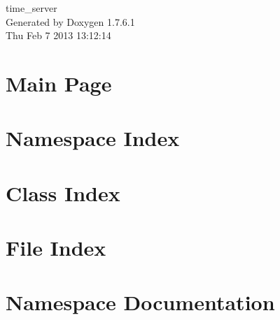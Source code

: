 \documentclass[a4paper]{book}
\begin{document}
\begin{titlepage}
\vspace*{7cm}
\begin{center}
{\Large time\-\_\-server }\\
\vspace*{1cm}
{\large \-Generated by Doxygen 1.7.6.1}\\
\vspace*{0.5cm}
{\small Thu Feb 7 2013 13:12:14}\\
\end{center}
\end{titlepage}
\clearemptydoublepage
{}
\tableofcontents
\clearemptydoublepage
{}
\chapter{\-Main \-Page}
\label{index}
\chapter{\-Namespace \-Index}

\chapter{\-Class \-Index}

\chapter{\-File \-Index}

\chapter{\-Namespace \-Documentation}







\end{document}
